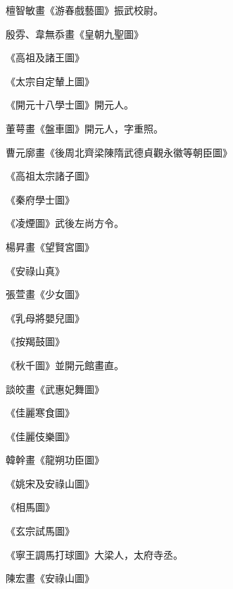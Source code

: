 \begin{pinyinscope}
 檀智敏畫《游春戲藝圖》振武校尉。



 殷雰、韋無忝畫《皇朝九聖圖》



 《高祖及諸王圖》



 《太宗自定輦上圖》



 《開元十八學士圖》開元人。



 董萼畫《盤車圖》開元人，字重照。



 曹元廓畫《後周北齊梁陳隋武德貞觀永徽等朝臣圖》



 《高祖太宗諸子圖》



 《秦府學士圖》



 《凌煙圖》武後左尚方令。



 楊昇畫《望賢宮圖》



 《安祿山真》



 張萱畫《少女圖》



 《乳母將嬰兒圖》



 《按羯鼓圖》



 《秋千圖》並開元館畫直。



 談皎畫《武惠妃舞圖》



 《佳麗寒食圖》



 《佳麗伎樂圖》



 韓幹畫《龍朔功臣圖》



 《姚宋及安祿山圖》



 《相馬圖》



 《玄宗試馬圖》



 《寧王調馬打球圖》大梁人，太府寺丞。



 陳宏畫《安祿山圖》




\end{pinyinscope}
